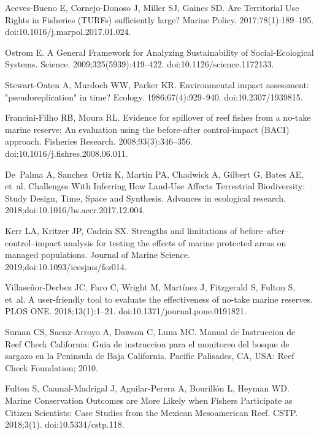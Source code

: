 \documentclass[10pt,letterpaper]{article}
\begin{document}
\begin{thebibliography}{10}
Aceves-Bueno E, Cornejo-Donoso J, Miller SJ, Gaines SD.
\newblock Are Territorial Use Rights in Fisheries ({TURFs}) sufficiently large?
\newblock Marine Policy. 2017;78(1):189--195.
\newblock doi:{10.1016/j.marpol.2017.01.024}.

Ostrom E.
\newblock A General Framework for Analyzing Sustainability of Social-Ecological
  Systems.
\newblock Science. 2009;325(5939):419--422.
\newblock doi:{10.1126/science.1172133}.

Stewart-Oaten A, Murdoch WW, Parker KR.
\newblock Environmental impact assessment: "pseudoreplication" in time?
\newblock Ecology. 1986;67(4):929--940.
\newblock doi:{10.2307/1939815}.

Francini-Filho RB, Moura RL.
\newblock Evidence for spillover of reef fishes from a no-take marine reserve:
  An evaluation using the before-after control-impact ({BACI}) approach.
\newblock Fisheries Research. 2008;93(3):346--356.
\newblock doi:{10.1016/j.fishres.2008.06.011}.

De~Palma A, Sanchez~Ortiz K, Martin PA, Chadwick A, Gilbert G, Bates AE, et~al.
\newblock Challenges With Inferring How Land-Use Affects Terrestrial
  Biodiversity: Study Design, Time, Space and Synthesis.
\newblock Advances in ecological research.
  2018;doi:{10.1016/bs.aecr.2017.12.004}.

Kerr LA, Kritzer JP, Cadrin SX.
\newblock Strengths and limitations of before–after–control–impact
  analysis for testing the effects of marine protected areas on managed
  populations.
 Journal of Marine Science. 2019;doi:{10.1093/icesjms/fsz014}.

Villaseñor-Derbez JC, Faro C, Wright M, Martínez J, Fitzgerald S, Fulton S,
  et~al.
\newblock A user-friendly tool to evaluate the effectiveness of no-take marine
  reserves.
\newblock PLOS ONE. 2018;13(1):1--21.
\newblock doi:{10.1371/journal.pone.0191821}.

Suman CS, Saenz-Arroyo A, Dawson C, Luna MC.
\newblock Manual de Instruccion de Reef Check California: Guia de instruccion
  para el monitoreo del bosque de sargazo en la Peninsula de Baja California.
\newblock Pacific Palisades, CA, USA: Reef Check Foundation; 2010.

Fulton S, Caamal-Madrigal J, Aguilar-Perera A, Bourillón L, Heyman WD.
\newblock Marine Conservation Outcomes are More Likely when Fishers Participate
  as Citizen Scientists: Case Studies from the Mexican Mesoamerican Reef.
\newblock CSTP. 2018;3(1).
\newblock doi:{10.5334/cstp.118}.


\end{thebibliography}
\end{document}
